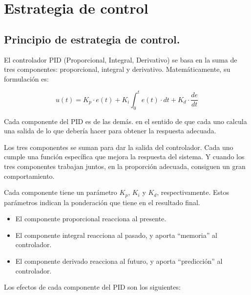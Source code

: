 \chapter{Estrategia de control}

\label{C:Formas de control}

\section{Principio de estrategia de control.}
El controlador PID (Proporcional, Integral, Derivativo) se basa en la suma de tres componentes: proporcional, integral y derivativo. Matemáticamente, su formulación es: \par
\begin{equation}
u(t)=K_p\cdot e(t)+K_i\int_0^t e(t)\cdot dt+K_d\cdot \frac{de}{dt}
\end{equation} \par 
Cada componente del PID es  de las demás. en el sentido de que cada uno calcula una salida de lo que  debería hacer para obtener la respuesta adecuada. \par 
Los tres componentes se suman para dar la salida del controlador. Cada uno cumple una función específica que mejora la respuesta del sistema. Y cuando los tres componentes trabajan juntos, en la proporción adecuada, consiguen un gran comportamiento. \par 
Cada componente tiene un parámetro $K_p$, $K_i$ y $K_d$, respectivamente. Estos parámetros indican la ponderación que tiene en el resultado final.
\begin{itemize}
\item El componente proporcional reacciona al presente.
\item El componente integral reacciona al pasado, y aporta “memoria” al controlador.
\item El componente derivado reacciona al futuro, y aporta “predicción” al controlador.
\end{itemize} \par 
Los efectos de cada componente del PID son los siguientes:

